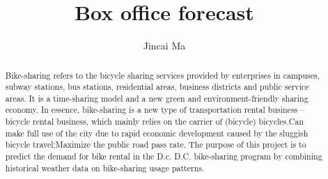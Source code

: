 \documentclass{amsart}
\begin{document}
%
%
\title[A Short Running Title]{ Box office forecast}%

\author{Jincai Ma}
\address[A.~1]{School of Computer Science,\\ 
Xi'an Shiyou University, Shaanxi 710065, China}%


%
\date{\gitAuthorDate}%

\begin{abstract}
    Bike-sharing refers to the bicycle sharing services provided by enterprises in campuses, subway stations, bus stations, residential areas, business districts and public service areas. It is a time-sharing model and a new green and environment-friendly sharing economy.
In essence, bike-sharing is a new type of transportation rental business -- bicycle rental business, which mainly relies on the carrier of (bicycle) bicycles.Can make full use of the city due to rapid economic development caused by the sluggish bicycle travel;Maximize the public road pass rate.
The purpose of this project is to predict the demand for bike rental in the D.c. D.C. bike-sharing program by combining historical weather data on bike-sharing usage patterns.\\
    
\end{abstract}

\maketitle
\tableofcontents

\newpage



\newpage




\listoftodos
\end{document}
